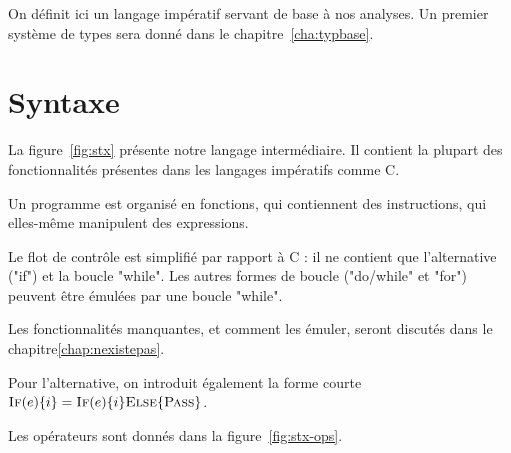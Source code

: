 On définit ici un langage impératif servant de base à nos analyses. Un premier
système de types sera donné dans le chapitre~\ref{cha:typbase}.

\section{Syntaxe}

La figure~\ref{fig:stx} présente notre langage intermédiaire. Il contient la
plupart des fonctionnalités présentes dans les langages impératifs comme C.

Un programme est organisé en fonctions, qui contiennent des instructions, qui
elles-même manipulent des expressions.

Le flot de contrôle est simplifié par rapport à C : il ne contient que
l'alternative ("if") et la boucle "while". Les autres formes de boucle
("do/while" et "for") peuvent être émulées par une boucle "while".

Les fonctionnalités manquantes, et comment les émuler, seront discutés dans le
chapitre\ref{chap:nexistepas}. %

Pour l'alternative, on introduit également la forme courte $\textsc{If}(e) \{ i \} =
\textsc{If}(e) \{ i \} \textsc{Else} \{ \textsc{Pass} \}$.

Les opérateurs sont donnés dans la figure~\ref{fig:stx-ops}.

